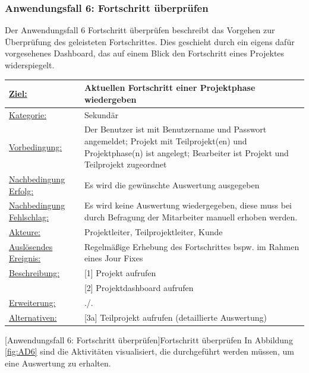 \subsubsection{Anwendungsfall 6: Fortschritt überprüfen}
Der Anwendungsfall 6 \glqq{}Fortschritt überprüfen\grqq{} beschreibt das Vorgehen zur Überprüfung des geleisteten Fortschrittes. Dies geschieht durch ein eigens dafür vorgesehenes Dashboard, das auf einem Blick den Fortschritt eines Projektes widerspiegelt.\\
\begin{tabularx}{\textwidth}{|p{}|p{}|}
        \hline
        \underline{Ziel:} & Aktuellen Fortschritt einer Projektphase wiedergeben\\\hline
        \underline{Kategorie:} & Sekundär \\\hline
        \underline{Vorbedingung:} & Der Benutzer ist mit Benutzername und Passwort angemeldet; Projekt mit Teilprojekt(en) und Projektphase(n) ist angelegt; Bearbeiter ist Projekt und Teilprojekt zugeordnet\\\hline
        \underline{Nachbedingung Erfolg:} & Es wird die gewünschte Auswertung ausgegeben\\\hline
        \underline{Nachbedingung Fehlschlag:} &  Es wird keine Auswertung wiedergegeben, diese muss bei durch Befragung der Mitarbeiter manuell erhoben werden.\\\hline
        \underline{Akteure:} & Projektleiter, Teilprojektleiter, Kunde \\\hline
        \underline{Auslösendes Ereignis:} & Regelmäßige Erhebung des Fortschrittes bspw. im Rahmen eines Jour Fixes \\\hline        
        \multirow{1}{*}{\underline{Beschreibung:}} & [1] Projekt aufrufen\\
        & [2] Projektdashboard aufrufen\\\hline
        \multirow{1}{*}{\underline{Erweiterung:}} & ./. \\\hline
        \underline{Alternativen:} & [3a] Teilprojekt aufrufen (detaillierte Auswertung)\\\hline
\end{tabularx}
[Anwendungsfall 6: Fortschritt überprüfen]{Fortschritt überprüfen}
\newpage
In Abbildung \ref{fig:AD6} sind die Aktivitäten visualisiert, die durchgeführt werden müssen, um eine Auswertung zu erhalten.
